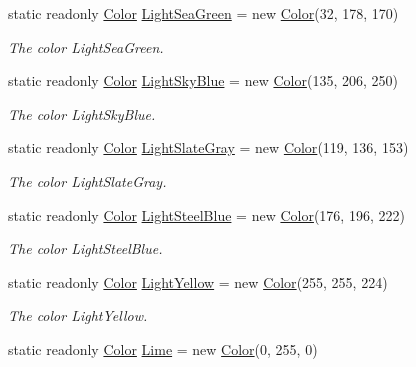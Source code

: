 \begin{DoxyCompactItemize}
static readonly \hyperlink{struct_tri_devs_1_1_tri_engine_1_1_color}{Color} \hyperlink{struct_tri_devs_1_1_tri_engine_1_1_color_abf128d7ddcd03c1f6a04563b6efb4502}{Light\-Sea\-Green} = new \hyperlink{struct_tri_devs_1_1_tri_engine_1_1_color}{Color}(32, 178, 170)
\begin{DoxyCompactList}\small\item\em The color Light\-Sea\-Green. \end{DoxyCompactList}\item 
static readonly \hyperlink{struct_tri_devs_1_1_tri_engine_1_1_color}{Color} \hyperlink{struct_tri_devs_1_1_tri_engine_1_1_color_a885f0f539825a5833a6531bac3377571}{Light\-Sky\-Blue} = new \hyperlink{struct_tri_devs_1_1_tri_engine_1_1_color}{Color}(135, 206, 250)
\begin{DoxyCompactList}\small\item\em The color Light\-Sky\-Blue. \end{DoxyCompactList}\item 
static readonly \hyperlink{struct_tri_devs_1_1_tri_engine_1_1_color}{Color} \hyperlink{struct_tri_devs_1_1_tri_engine_1_1_color_a453a379ff916decb97bd3ffec1ce0459}{Light\-Slate\-Gray} = new \hyperlink{struct_tri_devs_1_1_tri_engine_1_1_color}{Color}(119, 136, 153)
\begin{DoxyCompactList}\small\item\em The color Light\-Slate\-Gray. \end{DoxyCompactList}\item 
static readonly \hyperlink{struct_tri_devs_1_1_tri_engine_1_1_color}{Color} \hyperlink{struct_tri_devs_1_1_tri_engine_1_1_color_aaa55145084c4f0a339f0e3cea78caa3a}{Light\-Steel\-Blue} = new \hyperlink{struct_tri_devs_1_1_tri_engine_1_1_color}{Color}(176, 196, 222)
\begin{DoxyCompactList}\small\item\em The color Light\-Steel\-Blue. \end{DoxyCompactList}\item 
static readonly \hyperlink{struct_tri_devs_1_1_tri_engine_1_1_color}{Color} \hyperlink{struct_tri_devs_1_1_tri_engine_1_1_color_ae27e9f34bc79dc4832d35f80aba535a6}{Light\-Yellow} = new \hyperlink{struct_tri_devs_1_1_tri_engine_1_1_color}{Color}(255, 255, 224)
\begin{DoxyCompactList}\small\item\em The color Light\-Yellow. \end{DoxyCompactList}\item 
static readonly \hyperlink{struct_tri_devs_1_1_tri_engine_1_1_color}{Color} \hyperlink{struct_tri_devs_1_1_tri_engine_1_1_color_a05cbcba22a8363233728e10e2281ac32}{Lime} = new \hyperlink{struct_tri_devs_1_1_tri_engine_1_1_color}{Color}(0, 255, 0)

\end{DoxyCompactItemize}
